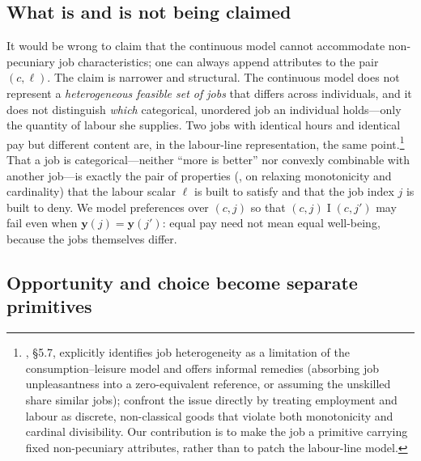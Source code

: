 \subsection{What is and is not being claimed}
\label{sub:claim}

It would be wrong to claim that the continuous model cannot accommodate
non-pecuniary job characteristics; one can always append attributes to the
pair $(c,\ell)$. The claim is narrower and structural. The continuous model
does not represent a \emph{heterogeneous feasible set of jobs} that differs
across individuals, and it does not distinguish \emph{which} categorical,
unordered job an individual holds---only the quantity of labour she supplies.
Two jobs with identical hours and identical pay but different content are, in
the labour-line representation, the same point.\footnote{%
\textcite{fleurbaey2008income}, \S5.7, explicitly identifies job heterogeneity
as a limitation of the consumption--leisure model and offers informal
remedies (absorbing job unpleasantness into a zero-equivalent reference, or
assuming the unskilled share similar jobs);
\citet{fleurbaey_maniquet_2019} confront the issue directly by treating
employment and labour as discrete, non-classical goods that violate both
monotonicity and cardinal divisibility. Our contribution is to make the job a
primitive carrying fixed non-pecuniary attributes, rather than to patch the
labour-line model.}
That a job is categorical---neither ``more is better'' nor convexly
combinable with another job---is exactly the pair of properties
(\citealp{fleurbaey_maniquet_2019}, on relaxing monotonicity and cardinality)
that the labour scalar $\ell$ is built to satisfy and that the job index $j$
is built to deny. We model preferences over $(c,j)$ so that
$(c,j)\mathrel{I}(c,j')$ may fail even when $\mathbf y(j)=\mathbf y(j')$:
equal pay need not mean equal well-being, because the jobs themselves differ.

\subsection{Opportunity and choice become separate primitives}
\label{sub:separation}

